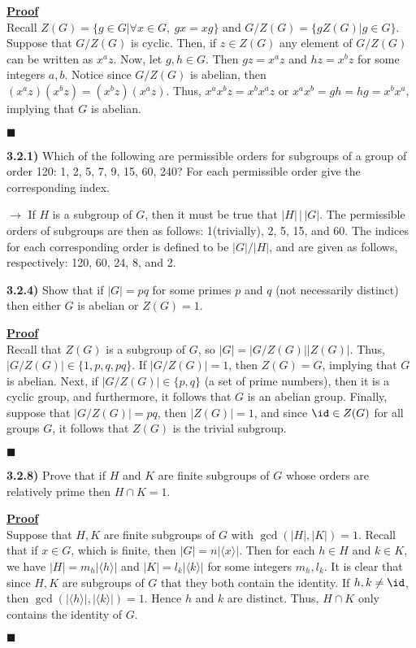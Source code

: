 \documentclass[12pt,a4paper]{article}
\newcommand{\prob}[2]{\textbf{#1)} #2}
\newenvironment{proof}
{
\textbf{\underline{Proof}} \\
}
{
\begin{flushright}
$\blacksquare$
\end{flushright}}
\begin{document}
\begin{proof}
Recall $Z(G) = \{g \in G | \forall x \in G,~ gx = xg\}$ and $G/Z(G) = \{gZ(G)|g \in G\}$. Suppose that $G/Z(G)$ is cyclic. Then, if $z \in Z(G)$ any element of $G/Z(G)$ can be written as $x^az$. Now, let $g,h \in G$. Then $gz = x^az$ and $hz = x^bz$ for some integers $a,b$. Notice since $G/Z(G)$ is abelian, then $(x^az)(x^bz) = (x^bz)(x^az)$. Thus, $x^ax^bz = x^bx^az$ or $x^ax^b = gh = hg = x^bx^a$, implying that $G$ is abelian.
\end{proof}

\prob{3.2.1}{Which of the following are permissible orders for subgroups of a group of order 120: 1, 2, 5, 7, 9, 15, 60, 240? For each permissible order give the corresponding index.}

$\rightarrow$ If $H$ is a subgroup of $G$, then it must be true that $|H|\,\big|\,|G|$. The permissible orders of subgroups are then as follows: 1(trivially), 2, 5, 15, and 60. The indices for each corresponding order is defined to be $|G|/|H|$, and are given as follows, respectively: 120, 60, 24, 8, and 2.

\prob{3.2.4}{Show that if $|G| = pq$ for some primes $p$ and $q$ (not necessarily distinct) then either $G$ is abelian or $Z(G) = 1$.}

\begin{proof}
Recall that $Z(G)$ is a subgroup of $G$, so $|G| = |G/Z(G)||Z(G)|$. Thus, $|G/Z(G)| \in \{1,p,q,pq\}$. If $|G/Z(G)| = 1$, then $Z(G) = G$, implying that $G$ is abelian. Next, if $|G/Z(G)| \in \{p,q\}$ (a set of prime numbers), then it is a cyclic group, and furthermore, it follows that $G$ is an abelian group. Finally, suppose that $|G/Z(G)| = pq$, then $|Z(G)| = 1$, and since $\id \in Z(G)$ for all groups $G$, it follows that $Z(G)$ is the trivial subgroup.
\end{proof}

\prob{3.2.8}{Prove that if $H$ and $K$ are finite subgroups of $G$ whose orders are relatively prime then $H \cap K = 1$.}

\begin{proof}
Suppose that $H,K$ are finite subgroups of $G$ with $\gcd(|H|,|K|) = 1$. Recall that if $x \in G$, which is finite, then $|G| = n|\langle x \rangle|$. Then for each $h \in H$ and $k \in K$, we have $|H| = m_h|\langle h \rangle|$ and $|K| = l_k|\langle k \rangle|$ for some integers $m_h,l_k$. It is clear that since $H,K$ are subgroups of $G$ that they both contain the identity. If $h,k \not= \id$, then $\gcd(|\langle h \rangle|,|\langle k \rangle|) = 1$. Hence $h$ and $k$ are distinct. Thus, $H \cap K$ only contains the identity of $G$.
\end{proof}
\end{document}
